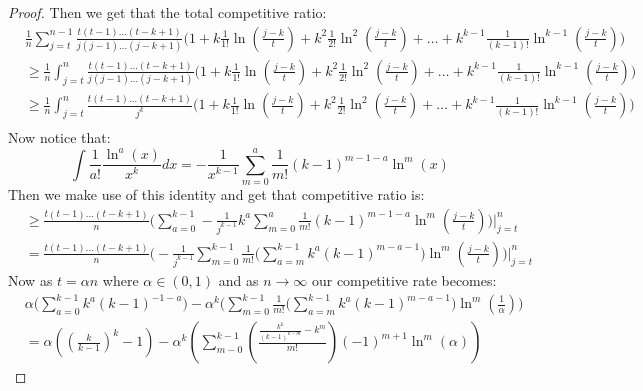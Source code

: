 \begin{proof}
Then we get that the total competitive ratio: 
\begin{align}
     & \frac{1}{n}\sum_{j = t}^{n - 1}
     \frac{t(t - 1)\dots (t - k + 1)}{j(j - 1)\dots(j - k + 1)}(1 + {k}\frac{1}{1!}\ln (\frac{j - k}{t}) + {k ^ 2}\frac{1}{2!}\ln^2(\frac{j - k}{t}) + \dots + {k^{k - 1}}\frac{1}{(k-1)!}\ln^{k - 1}(\frac{j - k}{t})\Big)\\
     & \geq
     \frac{1}{n}\int_{j = t}^{n}
     \frac{t(t - 1)\dots (t - k + 1)}{j(j - 1)\dots(j - k + 1)}\Big(1 + {k}\frac{1}{1!}\ln (\frac{j - k}{t}) + {k^2}\frac{1}{2!}\ln^2(\frac{j - k}{t}) + \dots + {k^{k - 1}}\frac{1}{(k-1)!}\ln^{k - 1}(\frac{j - k}{t})\Big)\\
     & \geq
     \frac{1}{n}\int_{j = t}^{n}
     \frac{t(t - 1)\dots (t - k + 1)}{j^k}\Big(1 + {k}\frac{1}{1!}\ln (\frac{j - k}{t}) + {k^2}\frac{1}{2!}\ln^2(\frac{j - k}{t}) + \dots + {k^{k - 1}}\frac{1}{(k-1)!}\ln^{k - 1}(\frac{j - k}{t})\Big)\\
\end{align}
Now notice that:
\begin{equation}
    \label{identity_two}
    \int\frac{1}{a!} \frac{\ln^a(x)}{x^k} dx = - \frac{1}{x^{k - 1}}\sum_{m = 0}^{a}\frac{1}{m!}(k -1)^{m - 1 -a }\ln^m(x)
\end{equation}
Then we make use of this identity and get that competitive ratio is:
\begin{align}
     & \geq\frac{t(t - 1)\dots (t - k + 1)}{n}
     \Big(\sum_{a = 0}^{k - 1}- \frac{1}{j^{k - 1}}{ k ^ a }\sum_{m = 0}^{a}\frac{1}{m!}(k -1)^{m - 1 -a }\ln^m(\frac{j - k}{t}) \Big) \Big|_{j = t}^{n}\\
     & =
     \frac{t(t - 1)\dots (t - k + 1)}{n}\Big(- \frac{1}{j^{k - 1}}\sum_{m = 0}^{k - 1}\frac{1}{m!}\Big(\sum_{a = m}^{k - 1}{k ^ a}(k - 1)^{m - a - 1}\Big)\ln^m{(\frac{j - k}{t})}\Big)\Big|_{j = t}^{n}
\end{align}
Now as $t = \alpha n $ where $\alpha \in (0,1)$ and as $n \xrightarrow{}\infty$ our competitive rate becomes:
\begin{align}
    & \alpha \Big(\sum_{a = 0}^{k - 1}{ k ^ a }{(k - 1)}^{-1 - a}\Big) - \alpha^k\Big(\sum_{m=0}^{k - 1}\frac{1}{m!}\Big(\sum_{a = m}^{k - 1}{ k ^ a }(k - 1)^{m - a - 1}\Big)\ln^m(\frac{1}{\alpha})\Big)\\
    & = \alpha\left({\left(\frac{k}{k-1}\right)}^{k} - 1\right) - \alpha^k\left(\sum_{m-0}^{k-1}\left(\frac{\frac{k^k}{(k-1)^{k-m}} - k^m}{m!}\right)(-1)^{m+1}\ln^m(\alpha)\right)
\end{align}


\end{proof}
